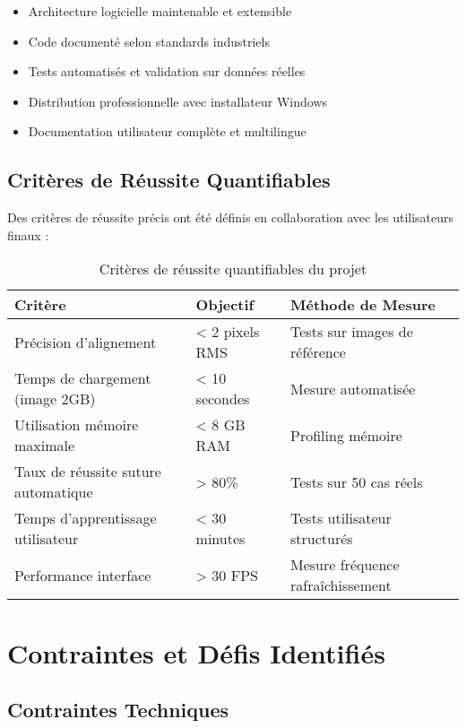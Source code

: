 \documentclass[12pt,a4paper]{report}
\begin{document}
\begin{itemize}
\item Architecture logicielle maintenable et extensible
\item Code documenté selon standards industriels
\item Tests automatisés et validation sur données réelles
\item Distribution professionnelle avec installateur Windows
\item Documentation utilisateur complète et multilingue
\end{itemize}

\subsection{Critères de Réussite Quantifiables}

Des critères de réussite précis ont été définis en collaboration avec les utilisateurs finaux :

\begin{table}[H]
\centering
\begin{tabular}{|p{5cm}|p{3cm}|p{4cm}|}
\hline
\textbf{Critère} & \textbf{Objectif} & \textbf{Méthode de Mesure} \\
\hline
Précision d'alignement & < 2 pixels RMS & Tests sur images de référence \\
\hline
Temps de chargement (image 2GB) & < 10 secondes & Mesure automatisée \\
\hline
Utilisation mémoire maximale & < 8 GB RAM & Profiling mémoire \\
\hline
Taux de réussite suture automatique & > 80\% & Tests sur 50 cas réels \\
\hline
Temps d'apprentissage utilisateur & < 30 minutes & Tests utilisateur structurés \\
\hline
Performance interface & > 30 FPS & Mesure fréquence rafraîchissement \\
\hline
\end{tabular}
\caption{Critères de réussite quantifiables du projet}
\end{table}

\section{Contraintes et Défis Identifiés}

\subsection{Contraintes Techniques}
\end{document}

